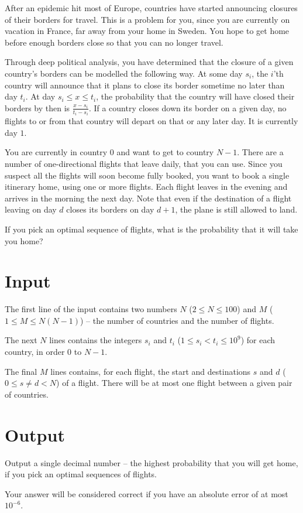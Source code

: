 After an epidemic hit most of Europe, countries have started announcing closures of their borders for travel.
This is a problem for you, since you are currently on vacation in France, far away from your home in Sweden.
You hope to get home before enough borders close so that you can no longer travel.

Through deep political analysis, you have determined that the closure of a given country's borders can be modelled the following way.
At some day $s_i$, the $i$'th country will announce that it plans to close its border sometime no later than day $t_i$.
At day $s_i \le x \le t_i$, the probability that the country will have closed their borders by then is $\frac{x - s_i}{t_i - s_i}$.
If a country closes down its border on a given day, no flights to or from that country will depart on that or any later day.
It is currently day $1$.

You are currently in country $0$ and want to get to country $N - 1$.
There are a number of one-directional flights that leave daily, that you can use.
Since you suspect all the flights will soon become fully booked, you want to book a single itinerary home, using one or more flights.
Each flight leaves in the evening and arrives in the morning the next day.
Note that even if the destination of a flight leaving on day $d$ closes its borders on day $d + 1$, the plane is still allowed to land.

If you pick an optimal sequence of flights, what is the probability that it will take you home?

\section*{Input}
The first line of the input contains two numbers $N$ ($2 \le N \le 100$) and $M$ ($1 \le M \le N(N-1)$)  -- the number of countries and the number of flights.

The next $N$ lines contains the integers $s_i$ and $t_i$ ($1 \le s_i < t_i \le 10^9$) for each country, in order $0$ to $N - 1$.

The final $M$ lines contains, for each flight, the start and destinations $s$ and $d$ ($0 \le s \neq d < N$) of a flight.
There will be at most one flight between a given pair of countries.

\section{Output}
Output a single decimal number -- the highest probability that you will get home, if you pick an optimal sequences of flights.

Your answer will be considered correct if you have an absolute error of at most ${10}^{-6}$.
